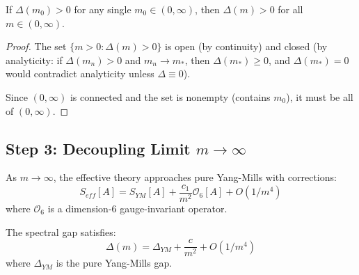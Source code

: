 \begin{corollary}
\label{cor:global-from-local}
If $\Delta(m_0) > 0$ for any single $m_0 \in (0, \infty)$, then $\Delta(m) > 0$ 
for all $m \in (0, \infty)$.
\end{corollary}

\begin{proof}
The set $\{m > 0 : \Delta(m) > 0\}$ is open (by continuity) and closed (by 
analyticity: if $\Delta(m_n) > 0$ and $m_n \to m_*$, then $\Delta(m_*) \geq 0$, 
and $\Delta(m_*) = 0$ would contradict analyticity unless $\Delta \equiv 0$).

Since $(0, \infty)$ is connected and the set is nonempty (contains $m_0$), it 
must be all of $(0, \infty)$.
\end{proof}

\subsection{Step 3: Decoupling Limit \texorpdfstring{$m \to \infty$}{m to infinity}}
\label{subsec:roadmap3-step3}

\begin{theorem}
\label{thm:hqet-lattice}
As $m \to \infty$, the effective theory approaches pure Yang-Mills with corrections:
\[
S_{eff}[A] = S_{YM}[A] + \frac{c_1}{m^2} \mathcal{O}_6[A] + O(1/m^4)
\]
where $\mathcal{O}_6$ is a dimension-6 gauge-invariant operator.

The spectral gap satisfies:
\[
\Delta(m) = \Delta_{YM} + \frac{c}{m^2} + O(1/m^4)
\]
where $\Delta_{YM}$ is the pure Yang-Mills gap.
\end{theorem}

